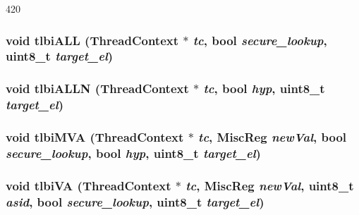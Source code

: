 \begin{DoxyCode}
420 {}
\end{DoxyCode}
\hypertarget{structArmISA_1_1ISA_a06e97933d5648bf0558da52b060bd815}{
\subsubsection[{tlbiALL}]{\setlength{\rightskip}{0pt plus 5cm}void tlbiALL ({\bf ThreadContext} $\ast$ {\em tc}, \/  bool {\em secure\_\-lookup}, \/  uint8\_\-t {\em target\_\-el})}}
\label{structArmISA_1_1ISA_a06e97933d5648bf0558da52b060bd815}
\hypertarget{structArmISA_1_1ISA_a6ea364a473aab7a0fd9d7f4f68bff214}{
\subsubsection[{tlbiALLN}]{\setlength{\rightskip}{0pt plus 5cm}void tlbiALLN ({\bf ThreadContext} $\ast$ {\em tc}, \/  bool {\em hyp}, \/  uint8\_\-t {\em target\_\-el})}}
\label{structArmISA_1_1ISA_a6ea364a473aab7a0fd9d7f4f68bff214}
\hypertarget{structArmISA_1_1ISA_af079c2af6d92761ccb2f8083884479a7}{
\subsubsection[{tlbiMVA}]{\setlength{\rightskip}{0pt plus 5cm}void tlbiMVA ({\bf ThreadContext} $\ast$ {\em tc}, \/  {\bf MiscReg} {\em newVal}, \/  bool {\em secure\_\-lookup}, \/  bool {\em hyp}, \/  uint8\_\-t {\em target\_\-el})}}
\label{structArmISA_1_1ISA_af079c2af6d92761ccb2f8083884479a7}
\hypertarget{structArmISA_1_1ISA_ac79ec0e36bd10b6ae9a109def0b71fb2}{
\subsubsection[{tlbiVA}]{\setlength{\rightskip}{0pt plus 5cm}void tlbiVA ({\bf ThreadContext} $\ast$ {\em tc}, \/  {\bf MiscReg} {\em newVal}, \/  uint8\_\-t {\em asid}, \/  bool {\em secure\_\-lookup}, \/  uint8\_\-t {\em target\_\-el})}}

